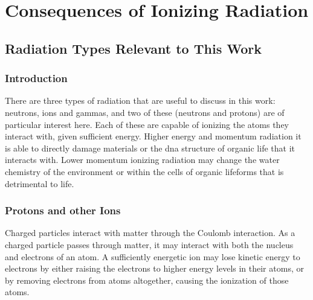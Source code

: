 \chapter{Consequences of Ionizing Radiation}
\label{chap:backgroundsources}

\begin{changemargin}{1.0cm}{1.0cm}
\end{changemargin}





\section{Radiation Types Relevant to This Work}


\subsection{Introduction}

There are three types of radiation that are useful to discuss in this work: neutrons, ions and gammas, and two of these (neutrons and protons) are of particular interest here.  Each of these are capable of ionizing the atoms they interact with, given sufficient energy.  Higher energy and momentum radiation it is able to directly damage materials or the \acrshort{dna} structure of organic life that it interacts with.  Lower momentum ionizing radiation may change the water chemistry of the environment or within the cells of organic lifeforms that is detrimental to life.



\subsection{Protons and other Ions}

Charged particles interact with matter through the Coulomb interaction.  As a charged particle passes through matter, it may interact with both the nucleus and electrons of an atom.  A sufficiently energetic ion may lose kinetic energy to electrons by either raising the electrons to higher energy levels in their atoms, or by removing electrons from atoms altogether, causing the ionization of those atoms.  

